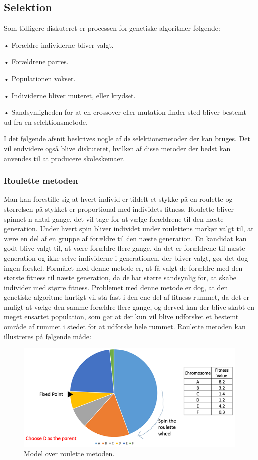 \subsection{Selektion}
Som tidligere diskuteret er processen for genetiske algoritmer følgende:

•	Forældre individerne bliver valgt.

•	Forældrene parres.

•	Populationen vokser.

•	Individerne bliver muteret, eller krydset.

•	Sandsynligheden for at en crossover eller mutation finder sted bliver bestemt ud fra en selektionsmetode.

I det følgende afsnit beskrives nogle af de selektionsmetoder der kan bruges. Det vil endvidere også blive diskuteret, hvilken af disse metoder der bedst kan anvendes til at producere skoleskemaer.

\subsubsection{Roulette metoden}

Man kan forestille sig at hvert individ er tildelt et stykke på en roulette og størrelsen på stykket er proportional med individets fitness. Roulette bliver spinnet n antal gange, det vil tage for at vælge forældrene til den næste generation. Under hvert spin bliver individet under roulettens markør valgt til, at være en del af en gruppe af forældre til den næste generation. En kandidat kan godt blive valgt til, at være forældre flere gange, da det er forældrene til næste generation og ikke selve individerne i generationen, der bliver valgt, gør det dog ingen forskel. Formålet med denne metode er, at få valgt de forældre med den største fitness til næste generation, da de har større sandsynlig for, at skabe individer med større fitness. Problemet med denne metode er dog, at den genetiske algoritme hurtigt vil stå fast i den ene del af fitness rummet, da det er muligt at vælge den samme forældre flere gange, og derved kan der blive skabt en meget ensartet population, som gør at der kun vil blive udforsket et bestemt område af rummet i stedet for at udforske hele rummet.
Roulette metoden kan illustreres på følgende måde:
\begin{figure}[!h]
  \centering
  \includegraphics[width=\textwidth]{partials/graphics/roulette.png}
  \caption{Model over roulette metoden.}
  \label{fig:roulette}
\end{figure}

